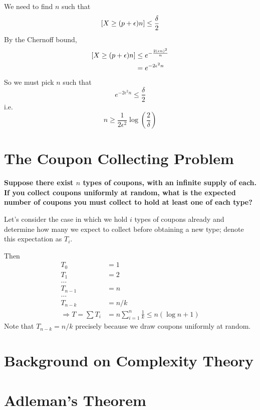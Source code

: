 \documentclass[11pt]{article}
\let\Pr\relax
\DeclareMathOperator*{\Pr}{\mathbb{P}}
\newcommand{\eps}{\epsilon}
\begin{document}
We need to find $n$ such that
$$ \Pr[X \ge (p + \eps)n] \le \frac{\delta}{2} $$
By the Chernoff bound,
\begin{align*}
  \Pr[X \ge (p + \eps)n] &\le e^{-\frac{2(\eps n)^2}{n}} \\
                         &= e^{-2\eps^2 n}
\end{align*}
So we must pick $n$ such that
$$ e^{-2\eps^2 n} \le \frac \delta 2 $$
i.e.
$$ n \ge \frac{1}{2\eps^2}\log\left(\frac{2}{\delta} \right) $$

\section{The Coupon Collecting Problem}

\textbf{Suppose there exist $n$ types of coupons, with an infinite supply of each. If you collect coupons uniformly at random, what is the expected number of coupons you must collect to hold at least one of each type?}

Let's consider the case in which we hold $i$ types of coupons already and determine how many we expect to collect before obtaining a new type; denote this expectation as $T_i$.

Then
\begin{align*}
  T_0 &= 1 \\
  T_1 &= 2 \\
  \ldots \\
  T_{n-1} &= n \\
  \ldots \\
  T_{n-k} &= n / k \\
  \Rightarrow T = \sum{T_i} &= n \sum_{i=1}^n \frac{1}{k} \leq n(\log n + 1)
\end{align*}
Note that $T_{n-k} = n / k$ precisely because we draw coupons uniformly at random.

\section{Background on Complexity Theory}

\section{Adleman's Theorem}



\begin{thebibliography}{42}


\end{thebibliography}
\end{document}
